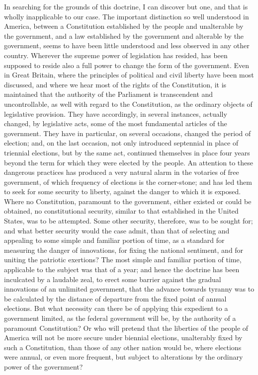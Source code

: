In searching for the grounds of this doctrine, I can discover but one, and that is wholly inapplicable to our case. The important distinction so well understood in America, between a Constitution established by the people and unalterable by the government, and a law established by the government and alterable by the government, seems to have been little understood and less observed in any other country. Wherever the supreme power of legislation has resided, has been supposed to reside also a full power to change the form of the government. Even in Great Britain, where the principles of political and civil liberty have been most discussed, and where we hear most of the rights of the Constitution, it is maintained that the authority of the Parliament is transcendent and uncontrollable, as well with regard to the Constitution, as the ordinary objects of legislative provision. They have accordingly, in several instances, actually changed, by legislative acts, some of the most fundamental articles of the government. They have in particular, on several occasions, changed the period of election; and, on the last occasion, not only introduced septennial in place of triennial elections, but by the same act, continued themselves in place four years beyond the term for which they were elected by the people. An attention to these dangerous practices has produced a very natural alarm in the votaries of free government, of which frequency of elections is the corner-stone; and has led them to seek for some security to liberty, against the danger to which it is exposed. Where no Constitution, paramount to the government, either existed or could be obtained, no constitutional security, similar to that established in the United States, was to be attempted. Some other security, therefore, was to be sought for; and what better security would the case admit, than that of selecting and appealing to some simple and familiar portion of time, as a standard for measuring the danger of innovations, for fixing the national sentiment, and for uniting the patriotic exertions? The most simple and familiar portion of time, applicable to the subject was that of a year; and hence the doctrine has been inculcated by a laudable zeal, to erect some barrier against the gradual innovations of an unlimited government, that the advance towards tyranny was to be calculated by the distance of departure from the fixed point of annual elections. But what necessity can there be of applying this expedient to a government limited, as the federal government will be, by the authority of a paramount Constitution? Or who will pretend that the liberties of the people of America will not be more secure under biennial elections, unalterably fixed by such a Constitution, than those of any other nation would be, where elections were annual, or even more frequent, but subject to alterations by the ordinary power of the government?


